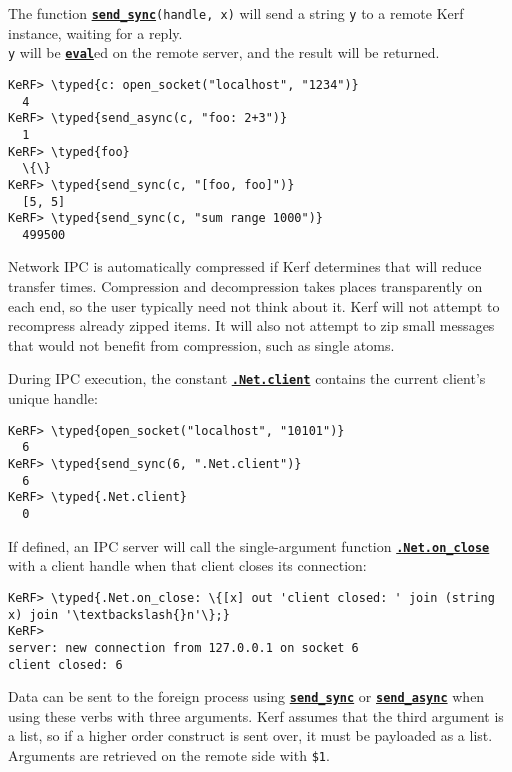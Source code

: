 \documentclass{article}
\newcommand{\typed}[1]{\textcolor{TealBlue}{#1}}
\newcommand{\primu}[2]{\hyperref[prim:#2]{\textbf{\texttt{#1}}}}
\newcommand{\prim}[1]{\primu{#1}{#1}}
\newcommand{\const}[2]{\hyperref[const:#2]{\textbf{\texttt{#1}}}}
\begin{document}
\vspace{0.5cm}

The function \primu{send\_sync}{sendSync}\texttt{(handle, x)} will send a string \texttt{y} to a remote Kerf instance, waiting for a reply. \\\texttt{y} will be \prim{eval}ed on the remote server, and the result will be returned.

\begin{Verbatim}
KeRF> \typed{c: open_socket("localhost", "1234")}
  4
KeRF> \typed{send_async(c, "foo: 2+3")}
  1
KeRF> \typed{foo}
  \{\}
KeRF> \typed{send_sync(c, "[foo, foo]")}
  [5, 5]
KeRF> \typed{send_sync(c, "sum range 1000")}
  499500
\end{Verbatim}

Network IPC is automatically compressed if Kerf determines that will reduce transfer times. Compression and decompression takes places transparently on each end, so the user typically need not think about it. Kerf will not attempt to recompress already zipped items. It will also not attempt to zip small messages that would not benefit from compression, such as single atoms.

\vspace{0.5cm}

During IPC execution, the constant \const{.Net.client}{netClient} contains the current client's unique handle:
\begin{Verbatim}
KeRF> \typed{open_socket("localhost", "10101")}
  6
KeRF> \typed{send_sync(6, ".Net.client")}
  6
KeRF> \typed{.Net.client}
  0
\end{Verbatim}

\pagebreak
If defined, an IPC server will call the single-argument function \const{.Net.on\_close}{netOnClose} with a client handle when that client closes its connection:
\begin{Verbatim}
KeRF> \typed{.Net.on_close: \{[x] out 'client closed: ' join (string x) join '\textbackslash{}n'\};}
KeRF> 
server: new connection from 127.0.0.1 on socket 6
client closed: 6

\end{Verbatim}

\vspace{0.5cm}
Data can be sent to the foreign process using \primu{send\_sync}{sendSync} or \primu{send\_async}{sendAsync} when using these verbs with three arguments. Kerf assumes that the third argument is a list, so if a higher order construct is sent over, it must be payloaded as a list. Arguments are retrieved on the remote side with \texttt{\$1}.
\end{document}
